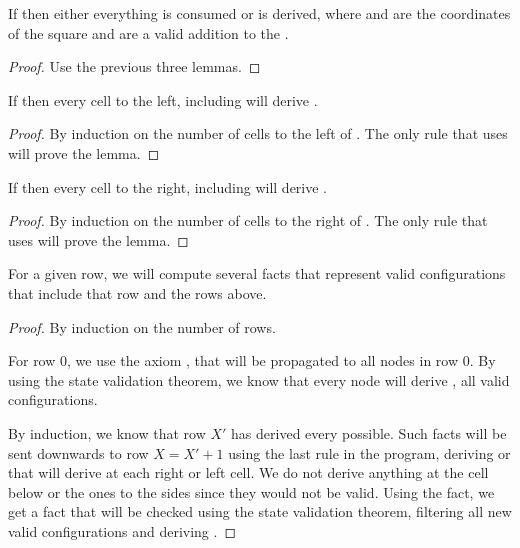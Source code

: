 \begin{theorem}
If  then either everything is consumed or  is derived, where  and  are the coordinates of the square and are a valid addition to the .
\end{theorem}
\begin{proof}
Use the previous three lemmas.
\end{proof}

\begin{lemma}
If  then every cell to the left, including  will derive .
\end{lemma}
\begin{proof}
By induction on the number of cells to the left of . The only rule that uses  will prove the lemma.
\end{proof}

\begin{lemma}
If  then every cell to the right, including  will derive .
\end{lemma}
\begin{proof}
By induction on the number of cells to the right of . The only rule that uses  will prove the lemma.
\end{proof}

\begin{theorem}
For a given row, we will compute several  facts that represent valid configurations that include that row and the rows above.
\end{theorem}
\begin{proof}
By induction on the number of rows.

For row 0, we use the axiom , that will be propagated to all nodes in row 0. By using the state validation theorem, we know that every node will derive , all valid configurations.


By induction, we know that row $X'$ has derived every  possible. Such facts will be sent downwards to row $X = X' + 1$ using the last rule in the program, deriving  or  that will derive  at each right or left cell. We do not derive anything at the cell below or the ones to the sides since they would not be valid. Using the  fact, we get a  fact that will be checked using the state validation theorem, filtering all new valid configurations and deriving .
\end{proof}



